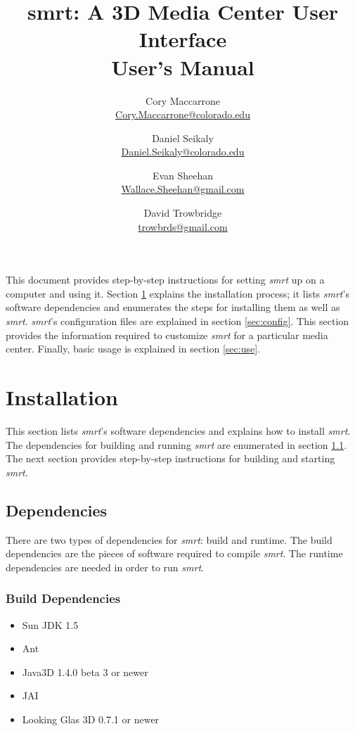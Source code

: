 \documentclass[letterpaper, titlepage, 11pt]{article}
\title{
	smrt: A 3D Media Center User Interface
	\\
	User's Manual
}
\author{
	Cory Maccarrone  \\ {\small \href{mailto:Cory.Maccarrone@colorado.edu}{Cory.Maccarrone@colorado.edu}}
	\and
	Daniel Seikaly   \\ {\small \href{mailto:Daniel.Seikaly@colorado.edu}{Daniel.Seikaly@colorado.edu}}
	\and
	Evan Sheehan     \\ {\small \href{mailto:Wallace.Sheehan@gmail.com}{Wallace.Sheehan@gmail.com}}
	\and
	David Trowbridge \\ {\small \href{mailto:trowbrds@gmail.com}{trowbrds@gmail.com}}
}
\begin{document}
\maketitle

\raggedbottom


\hspace{1em}
\pagebreak

\tableofcontents

\pagebreak
\hspace{1em}
\pagebreak






This document provides step-by-step instructions for setting \textit{smrt} up on
a computer and using it.  Section \ref{sec:install} explains the installation
process; it lists \textit{smrt}'s software dependencies and enumerates the steps
for installing them as well as \textit{smrt}.  \textit{smrt}'s configuration
files are explained in section \ref{sec:config}.  This section provides the
information required to customize \textit{smrt} for a particular media center.
Finally, basic usage is explained in section \ref{sec:use}.

\section{Installation}
\label{sec:install}
This section lists \textit{smrt}'s software dependencies and explains how to
install \textit{smrt}.  The dependencies for building and running \textit{smrt}
are enumerated in section \ref{sec:deps}.  The next section provides
step-by-step instructions for building and starting \textit{smrt}.

\subsection{Dependencies}
\label{sec:deps}
There are two types of dependencies for \textit{smrt}: build and runtime.  The
build dependencies are the pieces of software required to compile \textit{smrt}.
The runtime dependencies are needed in order to run \textit{smrt}.

\subsubsection{Build Dependencies}
\begin{itemize}
\item Sun JDK 1.5
\item Ant
\item Java3D 1.4.0 beta 3 or newer
\item JAI
\item Looking Glas 3D 0.7.1 or newer
\end{itemize}
\end{document}
